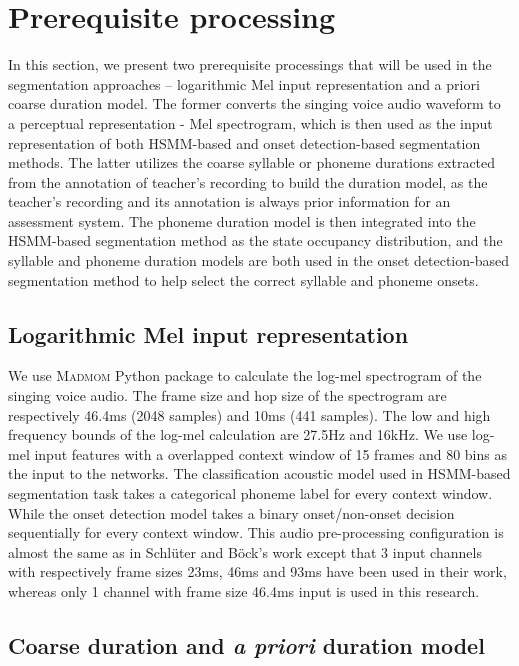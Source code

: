 \section{Prerequisite processing}

In this section, we present two prerequisite processings that will be used in the segmentation approaches -- logarithmic Mel input representation and a priori coarse duration model. The former converts the singing voice audio waveform to a perceptual representation - Mel spectrogram, which is then used as the input representation of both HSMM-based and onset detection-based segmentation methods. The latter utilizes the coarse syllable or phoneme durations extracted from the annotation of teacher's recording to build the duration model, as the teacher's recording and its annotation is always prior information for an assessment system. The phoneme duration model is then integrated into the HSMM-based segmentation method as the state occupancy distribution, and the syllable and phoneme duration models are both used in the onset detection-based segmentation method to help select the correct syllable and phoneme onsets.

\subsection{Logarithmic Mel input representation}\label{sec:ch5:input_representation}

We use \textsc{Madmom} \cite{Bock2016} Python package to calculate the log-mel spectrogram of the singing voice audio. The frame size and hop size of the spectrogram are respectively 46.4ms (2048 samples) and 10ms (441 samples). The low and high frequency bounds of the log-mel calculation are 27.5Hz and 16kHz. We use log-mel input features with a overlapped context window of 15 frames and 80 bins as the input to the networks. The classification acoustic model used in HSMM-based segmentation task takes a categorical phoneme label for every context window. While the onset detection model takes a binary onset/non-onset decision sequentially for every context window. This audio pre-processing configuration is almost the same as in Schl\"{u}ter and B\"{o}ck's work \cite{Schluter2014} except that 3 input channels with respectively frame sizes 23ms, 46ms and 93ms have been used in their work, whereas only 1 channel with frame size 46.4ms input is used in this research.

\subsection{Coarse duration and \textit{a priori} duration model}\label{sec:pp_coarse_duration}

